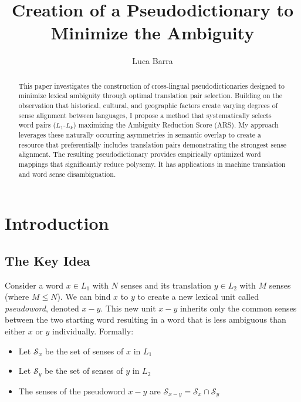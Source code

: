 \documentclass[runningheads]{llncs}
\begin{document}
\title{Creation of a Pseudodictionary to Minimize the Ambiguity}

\graphicspath{{images/}}

\author{Luca Barra}



\maketitle

\begin{abstract}
This paper investigates the construction of cross-lingual pseudodictionaries designed to minimize lexical ambiguity through optimal translation pair selection. Building on the observation that historical, cultural, and geographic factors create varying degrees of sense alignment between languages, I propose a method that systematically selects word pairs ($L_1$-$L_k$) maximizing the Ambiguity Reduction Score (ARS). My approach leverages these naturally occurring asymmetries in semantic overlap to create a resource that preferentially includes translation pairs demonstrating the strongest sense alignment. The resulting pseudodictionary provides empirically optimized word mappings that significantly reduce polysemy. It has applications in machine translation and word sense disambiguation.
\end{abstract}

\section{Introduction}

\subsection{The Key Idea}

Consider a word $x \in L_1$ with $N$ senses and its translation $y \in L_2$ with $M$ senses (where $M \leq N$). We can bind $x$ to $y$ to create a new lexical unit called \textit{pseudoword}, denoted $x-y$. This new unit $x-y$ inherits only the common senses between the two starting word resulting in a word that is less ambiguous than either $x$ or $y$ individually. Formally:

\begin{itemize}
  \item Let $\mathcal{S}_x$ be the set of senses of $x$ in $L_1$
  \item Let $\mathcal{S}_y$ be the set of senses of $y$ in $L_2$
  \item The senses of the pseudoword $x-y$ are $\mathcal{S}_{x-y} = \mathcal{S}_x \cap \mathcal{S}_y$
\end{itemize}
\end{document}

